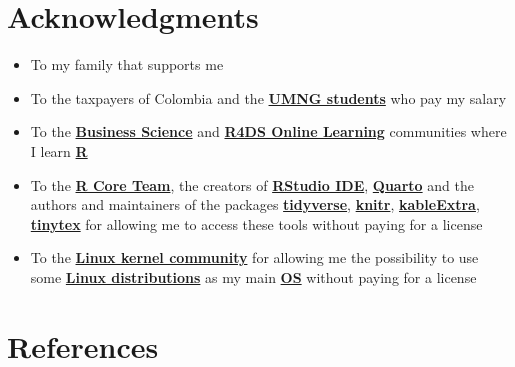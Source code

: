 \documentclass[
  ignorenonframetext,
]{beamer}
\begin{document}
\section{Acknowledgments}\label{acknowledgments}

\begin{frame}{}
\label{section-15}
\begin{itemize}
\item
  To my family that supports me
\item
  To the taxpayers of Colombia and the
  \href{https://www.umng.edu.co/estudiante}{\textbf{UMNG students}} who
  pay my salary
\item
  To the \href{https://www.business-science.io/}{\textbf{Business
  Science}} and \href{https://www.rfordatasci.com/}{\textbf{R4DS Online
  Learning}} communities where I learn
  \href{https://www.r-project.org/about.html}{\textbf{R}}
\item
  To the \href{https://www.r-project.org/contributors.html}{\textbf{R
  Core Team}}, the creators of
  \href{https://rstudio.com/products/rstudio/}{\textbf{RStudio IDE}},
  \href{https://quarto.org/}{\textbf{Quarto}} and the authors and
  maintainers of the packages
  \href{https://CRAN.R-project.org/package=tidyverse}{\textbf{tidyverse}},
  \href{https://CRAN.R-project.org/package=knitr}{\textbf{knitr}},
  \href{https://CRAN.R-project.org/package=kableExtra}{\textbf{kableExtra}},
  \href{https://CRAN.R-project.org/package=tinytex}{\textbf{tinytex}}
  for allowing me to access these tools without paying for a license
\item
  To the \href{https://www.kernel.org/category/about.html}{\textbf{Linux
  kernel community}} for allowing me the possibility to use some
  \href{https://static.lwn.net/Distributions/}{\textbf{Linux
  distributions}} as my main
  \href{https://en.wikipedia.org/wiki/Operating_system}{\textbf{OS}}
  without paying for a license
\end{itemize}
\end{frame}

\section*{References}\label{references}
\end{document}
